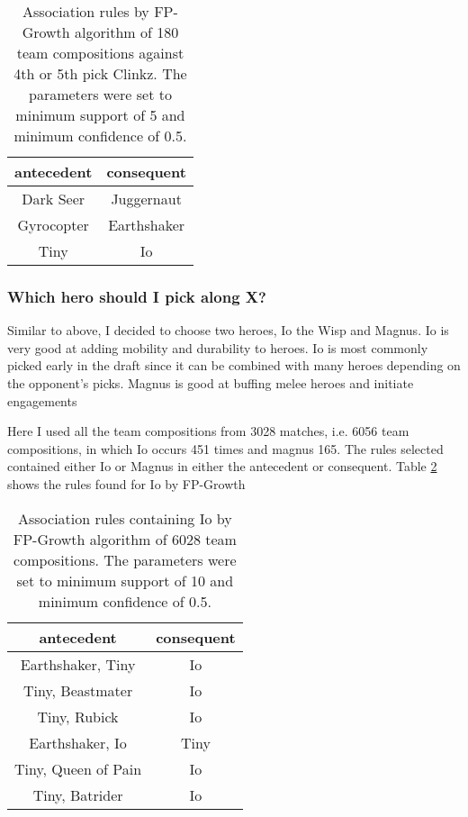 \documentclass[result.tex]{subfiles}
\begin{document}
\begin{table}[H]
  \centering
  \begin{tabular}{ | c | c | }
    \hline
    antecedent & consequent \\ \hline
    Dark Seer & Juggernaut \\ \hline
    Gyrocopter & Earthshaker \\ \hline
    Tiny & Io \\
    \hline
  \end{tabular}
  \caption{Association rules by FP-Growth algorithm of 180 team compositions against 4th or 5th pick Clinkz. The parameters were set to minimum support of 5 and minimum confidence of 0.5.}
  \label{tab:ass_clinkz}
\end{table}

\subsubsection*{Which hero should I pick along X?}

Similar to above, I decided to choose two heroes, Io the Wisp and Magnus. Io is very good at adding mobility and durability to heroes. Io is most commonly picked early in the draft since it can be combined with many heroes depending on the opponent's picks. Magnus is good at buffing melee heroes and initiate engagements

Here I used all the team compositions from 3028 matches, i.e. 6056 team compositions, in which Io occurs 451 times and magnus 165. The rules selected contained either Io or Magnus in either the antecedent or consequent. Table \ref{tab:ass_io} shows the rules found for Io by FP-Growth

\begin{table}[H]
  \centering
  \begin{tabular}{ | c | c | }
    \hline
    antecedent & consequent \\ \hline
    Earthshaker, Tiny & Io \\ \hline
    Tiny, Beastmater & Io \\ \hline
    Tiny, Rubick & Io \\ \hline
    Earthshaker, Io & Tiny  \\ \hline
    Tiny, Queen of Pain & Io \\ \hline
    Tiny, Batrider & Io \\
    \hline
  \end{tabular}
  \caption{Association rules containing Io by FP-Growth algorithm of 6028 team compositions. The parameters were set to minimum support of 10 and minimum confidence of 0.5.}
  \label{tab:ass_io}
\end{table}
\end{document}
